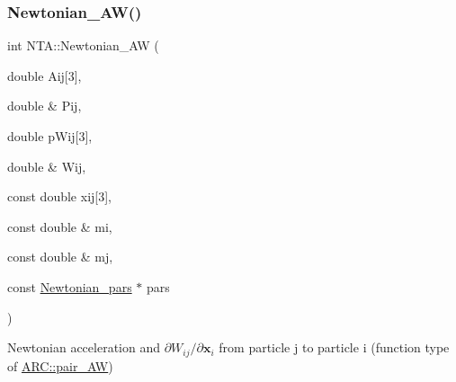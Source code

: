 \subsubsection{\texorpdfstring{Newtonian\+\_\+\+A\+W()}{Newtonian\_AW()}}
{\footnotesize\ttfamily int N\+T\+A\+::\+Newtonian\+\_\+\+AW (\begin{DoxyParamCaption}\item[{double}]{Aij\mbox{[}3\mbox{]},  }\item[{double \&}]{Pij,  }\item[{double}]{p\+Wij\mbox{[}3\mbox{]},  }\item[{double \&}]{Wij,  }\item[{const double}]{xij\mbox{[}3\mbox{]},  }\item[{const double \&}]{mi,  }\item[{const double \&}]{mj,  }\item[{const \hyperlink{classNTA_1_1Newtonian__pars}{Newtonian\+\_\+pars} $\ast$}]{pars }\end{DoxyParamCaption})}



Newtonian acceleration and $\partial W_{ij}/\partial \mathbf{x}_i$ from particle j to particle i (function type of \hyperlink{}{A\+R\+C\+::pair\+\_\+\+AW}) 


